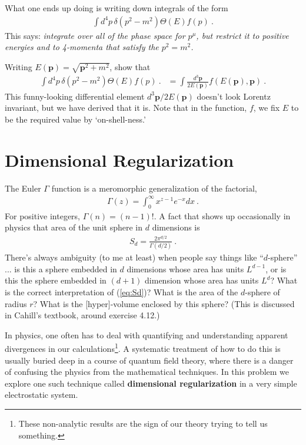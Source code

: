 \documentclass[12pt]{article}
\numberwithin{equation}{section}    %
\renewcommand{\vec}[1]{\mathbf{#1}} %
\begin{document}
What one ends up doing is writing down integrals of the form
\begin{align}
	\int d^4p \, \delta(p^2 - m^2) \Theta(E) f(p) \ .
\end{align}
This says: \emph{integrate over all of the phase space for $p^\mu$, but restrict it to positive energies and to 4-momenta that satisfy the $p^2=m^2$.}

Writing $E(\vec p) = \sqrt{\vec p^2 +m^2}$, show that
\begin{align}
	\int d^4p \, \delta(p^2 - m^2) \Theta(E) f(p) \ .
	& = 
	\int \frac{d^3\vec p}{2E(\vec p)} f(E(\vec p), \vec p) \ .
\end{align}
This funny-looking differential element $d^3\vec p/2E(\vec p)$ doesn't look Lorentz invariant, but we have derived that it is. Note that in the function, $f$, we fix $E$ to be the required value by `on-shell-ness.'




\section{Dimensional Regularization}


The Euler $\Gamma$ function is a meromorphic generalization of the factorial,
\begin{align}
	\Gamma(z) = \int_0^\infty x^{z-1}e^{-x} dx \ .
	\label{eq:Gamma}
\end{align}
For positive integers, $\Gamma(n) = (n-1)!$.
A fact that shows up occasionally in physics that area of the unit sphere in $d$ dimensions is
\begin{align}
	S_d = \frac{2\pi^{d/2}}{\Gamma(d/2)} \ .
	\label{eq:Sd}
\end{align}
There's always ambiguity (to me at least) when people say things like ``$d$-sphere'' ... is this a sphere embedded in $d$ dimensions whose area has units $L^{d-1}$, or is this the sphere embedded in $(d+1)$ dimension whose area has units $L^d$? What is the correct interpretation of (\ref{eq:Sd})? What is the area of the $d$-sphere of radius $r$? What is the [hyper]-volume enclosed by this sphere? (This is discussed in Cahill's textbook, around exercise 4.12.)



In physics, one often has to deal with quantifying and understanding apparent divergences in our calculations\footnote{These non-analytic results are the sign of our theory trying to tell us something.}. A systematic treatment of how to do this is usually buried deep in a course of quantum field theory, where there is a danger of confusing the physics from the mathematical techniques. In this problem we explore one such technique called \textbf{dimensional regularization} in a very simple electrostatic system. 
\end{document}
